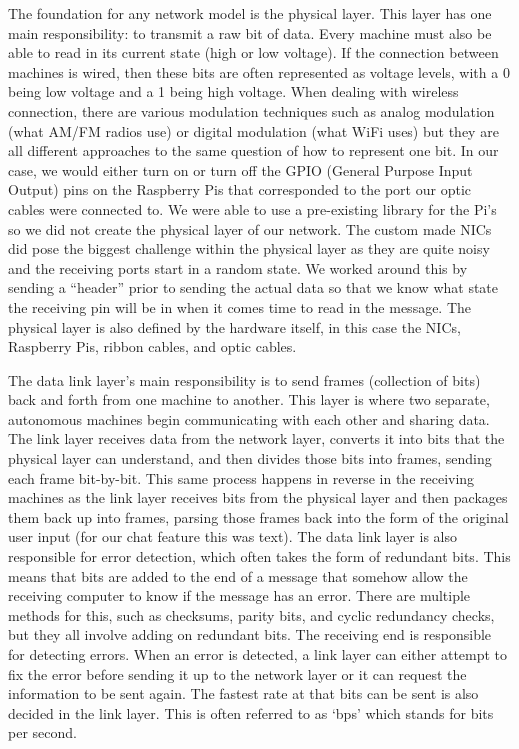 \documentclass[10pt, letterpaper, twocolumn]{article}
\begin{document}
The foundation for any network model is the physical layer. This layer has one main responsibility: to transmit a raw bit of data. Every machine must also be able to read in its current state (high or low voltage). If the connection between machines is wired, then these bits are often represented as voltage levels, with a 0 being low voltage and a 1 being high voltage. When dealing with wireless connection, there are various modulation techniques such as analog modulation (what AM/FM radios use) or digital modulation (what WiFi uses) but they are all different approaches to the same question of how to represent one bit. In our case, we would either turn on or turn off the GPIO (General Purpose Input Output) pins on the Raspberry Pis that corresponded to the port our optic cables were connected to. We were able to use a pre-existing library for the Pi’s so we did not create the physical layer of our network. The custom made NICs did pose the biggest challenge within the physical layer as they are quite noisy and the receiving ports start in a random state. We worked around this by sending a “header” prior to sending the actual data so that we know what state the receiving pin will be in when it comes time to read in the message. The physical layer is also defined by the hardware itself, in this case the NICs, Raspberry Pis, ribbon cables, and optic cables. 

The data link layer’s main responsibility is to send frames (collection of bits) back and forth from one machine to another. This layer is where two separate, autonomous machines begin communicating with each other and sharing data. The link layer receives data from the network layer, converts it into bits that the physical layer can understand, and then divides those bits into frames, sending each frame bit-by-bit. This same process happens in reverse in the receiving machines as the link layer receives bits from the physical layer and then packages them back up into frames, parsing those frames back into the form of the original user input (for our chat feature this was text). The data link layer is also responsible for error detection, which often takes the form of redundant bits. This means that bits are added to the end of a message that somehow allow the receiving computer to know if the message has an error. There are multiple methods for this, such as checksums, parity bits, and cyclic redundancy checks, but they all involve adding on redundant bits. The receiving end is responsible for detecting errors. When an error is detected, a link layer can either attempt to fix the error before sending it up to the network layer or it can request the information to be sent again. The fastest rate at that bits can be sent is also decided in the link layer. This is often referred to as ‘bps’ which stands for bits per second. 
\end{document}
